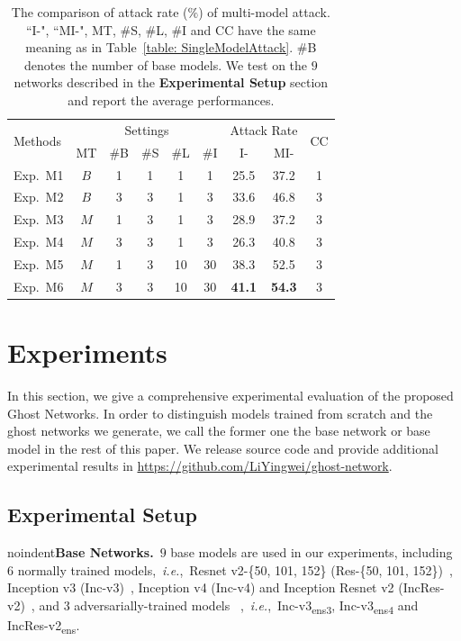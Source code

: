 \documentclass[letterpaper]{article} %
\def\ie{\emph{i.e.}}
\begin{document}
\begin{table}[tb]
\centering
\small
\begin{tabular}{|l|ccccc|cc|c|}
\hline
\multirow{2}{*}{Methods} & \multicolumn{5}{c|}{Settings} & \multicolumn{2}{c|}{Attack Rate} & \multirow{2}{*}{CC}  \\
\cline{2-8}
& MT & \#B & \#S & \#L & \#I & I- & MI- &\\
\hline
\hline
Exp.~M1 & $B$ & 1 & 1 & 1 & 1  & 25.5 & 37.2 & 1 \\
Exp.~M2 & $B$ & 3 & 3 & 1 & 3  & 33.6 & 46.8 & 3 \\
Exp.~M3 & $M$ & 1 & 3 & 1 & 3  & 28.9 & 37.2 & 3 \\
Exp.~M4 & $M$ & 3 & 3 & 1 & 3  & 26.3 & 40.8 & 3 \\
Exp.~M5 & $M$ & 1 & 3 & 10& 30 & 38.3 & 52.5 & 3 \\
Exp.~M6 & $M$ & 3 & 3 & 10& 30 & \textbf{41.1} & \textbf{54.3} & 3 \\
\hline
\end{tabular}
\caption{The comparison of attack rate ($\%$) of multi-model attack. ``I-", ``MI-", MT, \#S, \#L, \#I and CC have the same meaning as in Table~\ref{table: SingleModelAttack}. \#B denotes the number of base models. We test on the $9$ networks described in the \textbf{Experimental Setup} section and report the average performances.}
\label{table: MultiModelAttack}
\end{table}

\section{Experiments}
In this section, we give a comprehensive experimental evaluation of the proposed Ghost Networks. In order to distinguish models trained from scratch and the ghost networks we generate, we call the former one the base network or base model in the rest of this paper. We release source code and provide additional experimental results in \url{https://github.com/LiYingwei/ghost-network}.

\subsection{Experimental Setup} \label{sec:setupExp}
noindent\textbf{Base Networks.}~$9$ base models are used in our experiments,  including $6$ normally trained models,~\ie,~Resnet v2-\{50, 101, 152\} (Res-\{50, 101, 152\})~\cite{he2016identity}, Inception v3 (Inc-v3)~\cite{szegedy2017inception}, Inception v4 (Inc-v4) and Inception Resnet v2 (IncRes-v2)~\cite{szegedy2016rethinking}, and $3$ adversarially-trained models~\cite{tramer2017ensemble}%
,~\ie,~Inc-v3\textsubscript{ens3}, Inc-v3\textsubscript{ens4} and IncRes-v2\textsubscript{ens}.
\end{document}
